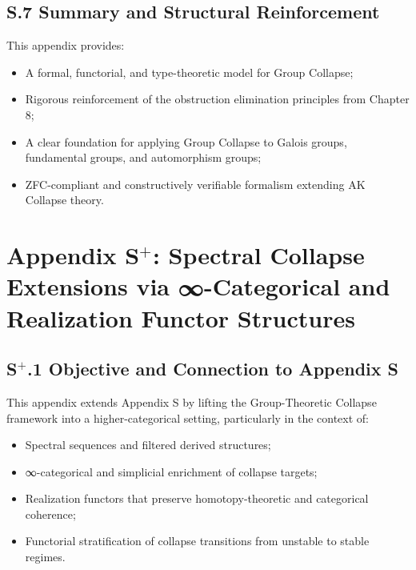 \documentclass[11pt]{article}
\begin{document}
\subsection*{S.7 Summary and Structural Reinforcement}

This appendix provides:

\begin{itemize}
    \item A formal, functorial, and type-theoretic model for Group Collapse;
    \item Rigorous reinforcement of the obstruction elimination principles from Chapter 8;
    \item A clear foundation for applying Group Collapse to Galois groups, fundamental groups, and automorphism groups;
    \item ZFC-compliant and constructively verifiable formalism extending AK Collapse theory.
\end{itemize}




\section*{Appendix S$^{+}$: Spectral Collapse Extensions via ∞-Categorical and Realization Functor Structures}

\subsection*{S$^{+}$.1 Objective and Connection to Appendix S}

This appendix extends Appendix S by lifting the Group-Theoretic Collapse framework into a higher-categorical setting, particularly in the context of:

\begin{itemize}
    \item Spectral sequences and filtered derived structures;
    \item ∞-categorical and simplicial enrichment of collapse targets;
    \item Realization functors that preserve homotopy-theoretic and categorical coherence;
    \item Functorial stratification of collapse transitions from unstable to stable regimes.
\end{itemize}
\end{document}
